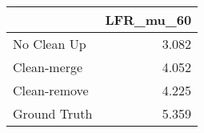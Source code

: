 \begin{tabular}{lr}
\toprule
{} & LFR_mu_60 \\
\midrule
No Clean Up  &     3.082 \\
Clean-merge  &     4.052 \\
Clean-remove &     4.225 \\
Ground Truth &     5.359 \\
\bottomrule
\end{tabular}
